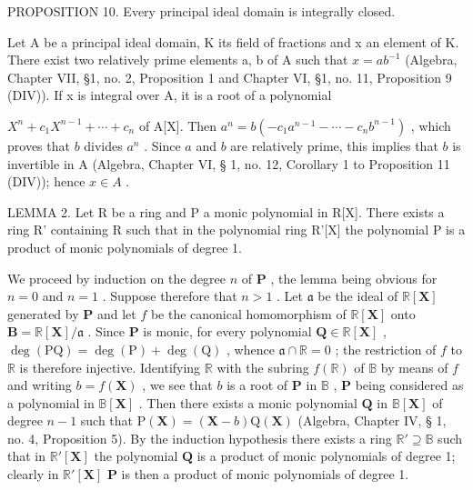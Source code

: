 PROPOSITION 10. Every principal ideal domain is integrally closed.\par

Let A be a principal ideal domain, K its field of fractions and x an element of K. There exist two relatively prime elements a, b of A such that \(x = ab^{-1}\) (Algebra, Chapter VII, §1, no. 2, Proposition 1 and Chapter VI, §1, no. 11, Proposition 9 (DIV)). If x is integral over A, it is a root of a polynomial

\(X^{n} + c_{1}X^{n-1} + \cdots + c_{n}\) of A{[}X{]}. Then \(a^{n} = b(-c_{1}a^{n-1} - \cdots - c_{n}b^{n-1})\) , which proves that \(b\) divides \(a^{n}\) . Since \(a\) and \(b\) are relatively prime, this implies that \(b\) is invertible in A (Algebra, Chapter VI, § 1, no. 12, Corollary 1 to Proposition 11 (DIV)); hence \(x \in A\) .

LEMMA 2. Let R be a ring and P a monic polynomial in R{[}X{]}. There exists a ring R' containing R such that in the polynomial ring R'{[}X{]} the polynomial P is a product of monic polynomials of degree 1.

We proceed by induction on the degree \(n\) of \(\mathbf{P}\) , the lemma being obvious for \(n = 0\) and \(n = 1\) . Suppose therefore that \(n > 1\) . Let \(\mathfrak{a}\) be the ideal of \(\mathbb{R}[\mathbf{X}]\) generated by \(\mathbf{P}\) and let \(f\) be the canonical homomorphism of \(\mathbb{R}[\mathbf{X}]\) onto \(\mathbf{B} = \mathbb{R}[\mathbf{X}] / \mathfrak{a}\) . Since \(\mathbf{P}\) is monic, for every polynomial \(\mathbf{Q} \in \mathbb{R}[\mathbf{X}]\) , \(\deg(\mathrm{PQ}) = \deg(\mathrm{P}) + \deg(\mathrm{Q})\) , whence \(\mathfrak{a} \cap \mathbb{R} = 0\) ; the restriction of \(f\) to \(\mathbb{R}\) is therefore injective. Identifying \(\mathbb{R}\) with the subring \(f(\mathbb{R})\) of \(\mathbb{B}\) by means of \(f\) and writing \(b = f(\mathbf{X})\) , we see that \(b\) is a root of \(\mathbf{P}\) in \(\mathbb{B}\) , \(\mathbf{P}\) being considered as a polynomial in \(\mathbb{B}[\mathbf{X}]\) . Then there exists a monic polynomial \(\mathbf{Q}\) in \(\mathbb{B}[\mathbf{X}]\) of degree \(n - 1\) such that \(\mathrm{P}(\mathbf{X}) = (\mathbf{X} - b)\mathrm{Q}(\mathbf{X})\) (Algebra, Chapter IV, § 1, no. 4, Proposition 5). By the induction hypothesis there exists a ring \(\mathbb{R}' \supseteq \mathbb{B}\) such that in \(\mathbb{R}'[\mathbf{X}]\) the polynomial \(\mathbf{Q}\) is a product of monic polynomials of degree 1; clearly in \(\mathbb{R}'[\mathbf{X}]\) \(\mathbf{P}\) is then a product of monic polynomials of degree 1.


